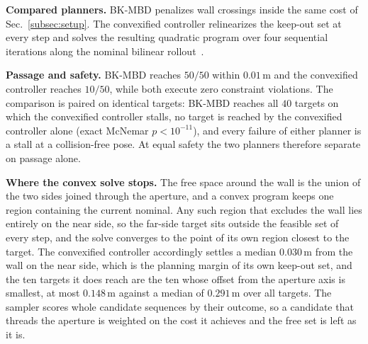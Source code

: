 \documentclass[letterpaper,10pt,conference]{ieeeconf}
\newcommand{\bkmbd}{\textsc{BK-MBD}}
\begin{document}
\textbf{Compared planners.}
\bkmbd{} penalizes wall crossings inside the same cost of Sec.~\ref{subsec:setup}.
The convexified controller relinearizes the keep-out set at every step and solves the resulting quadratic program over four sequential iterations along the nominal bilinear rollout~\cite{bruder2021bilinear}.

\textbf{Passage and safety.}
\bkmbd{} reaches $50/50$ within $0.01$\,m and the convexified controller reaches $10/50$, while both execute zero constraint violations.
The comparison is paired on identical targets: \bkmbd{} reaches all $40$ targets on which the convexified controller stalls, no target is reached by the convexified controller alone (exact McNemar $p < 10^{-11}$), and every failure of either planner is a stall at a collision-free pose.
At equal safety the two planners therefore separate on passage alone.

\textbf{Where the convex solve stops.}
The free space around the wall is the union of the two sides joined through the aperture, and a convex program keeps one region containing the current nominal.
Any such region that excludes the wall lies entirely on the near side, so the far-side target sits outside the feasible set of every step, and the solve converges to the point of its own region closest to the target.
The convexified controller accordingly settles a median $0.030$\,m from the wall on the near side, which is the planning margin of its own keep-out set, and the ten targets it does reach are the ten whose offset from the aperture axis is smallest, at most $0.148$\,m against a median of $0.291$\,m over all targets.
The sampler scores whole candidate sequences by their outcome, so a candidate that threads the aperture is weighted on the cost it achieves and the free set is left as it is.
\end{document}
